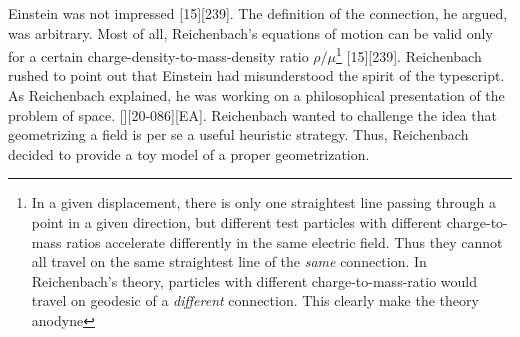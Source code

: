\documentclass[draft]{article}
\newcommand{\ap}{\ensuremath{\tau}\xspace}
\newcommand{\xdx}{\ensuremath{x_\nu} and \ensuremath{x_\nu + dx_\nu}\xspace}
\begin{document}


Einstein was not impressed [15][239]. The definition of the connection, he argued, was arbitrary. Most of all, Reichenbach's equations of motion can be valid only for a certain charge-density-to-mass-density ratio $\rho/\mu$\footnote{In a given displacement, there is only one straightest line passing through a point in a given direction, but different test particles with different charge-to-mass ratios accelerate differently in the same electric field. Thus they cannot all travel on the same straightest line of the \emph{same} connection. In Reichenbach's theory, particles with different charge-to-mass-ratio would travel on geodesic of a \emph{different} connection. This clearly make the theory anodyne} [15][239]. Reichenbach rushed to point out that Einstein had misunderstood the spirit of the typescript. As Reichenbach explained, he was working on a philosophical presentation of the problem of space. [][20-086][EA]. Reichenbach wanted to challenge the idea that geometrizing a field is per se a useful heuristic strategy. Thus, Reichenbach decided to provide a toy model of a proper geometrization. 
\end{document}
